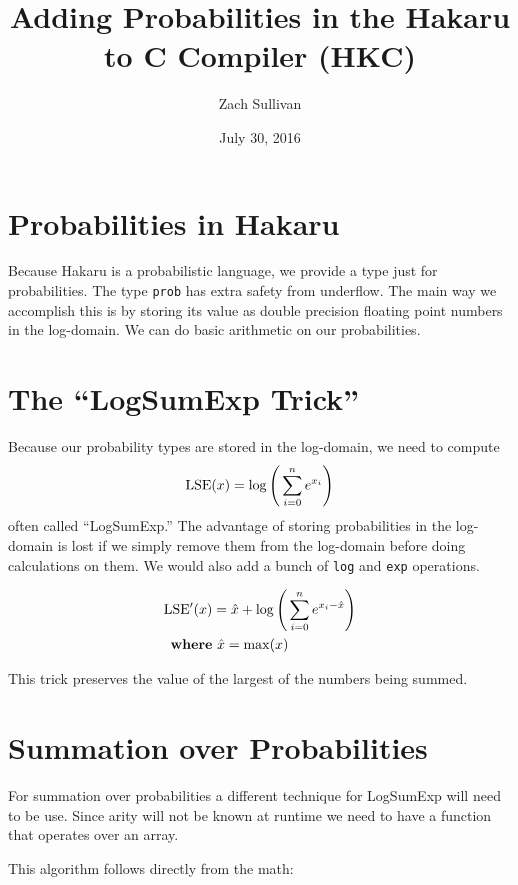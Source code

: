 \documentclass[12pt]{article}
\title{Adding Probabilities in the Hakaru to C Compiler (HKC)}
\author{Zach Sullivan}
\date{July 30, 2016}
\begin{document}
\maketitle

\section{Probabilities in Hakaru}

Because Hakaru is a probabilistic language, we provide a type just for
probabilities. The type {\tt prob} has extra safety from underflow. The main way
we accomplish this is by storing its value as double precision floating point
numbers in the log-domain. We can do basic arithmetic on our probabilities.

\section{The ``LogSumExp Trick''}
Because our probability types are stored in the log-domain, we need to compute
\begin{displaymath}
{\rm LSE}(x) = \log\Bigg(\sum_{i=0}^{n}{e^{x_i}}\Bigg)
\end{displaymath}
often called ``LogSumExp.'' The advantage of storing probabilities in the
log-domain is lost if we simply remove them from the log-domain before doing
calculations on them. We would also add a bunch of {\tt log} and {\tt exp}
operations.

\begin{align*}
{\rm LSE^\prime}(x) &= \hat x + \log\Bigg(\sum_{i=0}^{n}{e^{x_i-\hat x}}\Bigg)\\
{\rm\bf where}&\ \hat x = {\rm max}(x)
\end{align*}

This trick preserves the value of the largest of the numbers being summed.


\section{Summation over Probabilities}

For summation over probabilities a different technique for LogSumExp will need
to be use. Since arity will not be known at runtime we need to have a function
that operates over an array.

This algorithm follows directly from the math:
\end{document}
